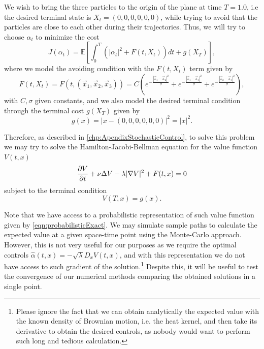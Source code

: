 We wish to bring the three particles to the origin of the plane at time $T=1.0$, i.e the desired terminal state is $X_t=(0,0,0,0,0,0)$, while trying to avoid that the particles are close to each other during their trajectories. Thus, we will try to choose $\alpha_t$ to minimize the cost
\begin{equation}
	J(\alpha_t)=\mathbb{E}\left[\int_{0}^{T}(|\alpha_t|^2+F(t,X_t)) dt +g(X_T)\right],
\end{equation}   
where we model the avoiding condition with the $F(t,X_t)$ term given by
\begin{equation}
	F(t,X_t)=F(t,(\vec{x}_1,\vec{x}_2,\vec{x}_3))=C\left(e^{-\frac{|\vec{x}_1-\vec{x}_2|^2}{\sigma}}+e^{-\frac{|\vec{x}_1-\vec{x}_3|^2}{\sigma}}+e^{-\frac{|\vec{x}_2-\vec{x}_3|^2}{\sigma}}\right),
\end{equation}
with $C,\sigma$ given constants, and we also model the desired terminal condition through the terminal cost $g(X_T)$ given by 
\begin{equation}
	g(x)=|x-(0,0,0,0,0,0)|^2=|x|^2.
\end{equation}

Therefore, as described in \autoref{chp:ApendixStochasticControl}, to solve this problem we may try to solve the Hamilton-Jacobi-Bellman equation for the value function $V(t,x)$
\begin{equation}
	\label{eqn:HJB_example}
	\frac{\partial V}{\partial t}+\nu \Delta V -\lambda |\nabla V|^2+F(t,x)=0
\end{equation}
subject to the terminal condition 
\begin{equation}
	V(T,x)=g(x).
\end{equation}

Note that we have access to a probabilistic representation of such value function given by \eqref{eqn:probabilisticExact}. We may simulate sample paths to calculate the expected value at a given space-time point using the Monte-Carlo approach. However, this is not very useful for our purposes as we require the optimal controls $\hat{\alpha}(t,x)=-\sqrt{\lambda}D_x V(t,x)$, and with this representation we do not have access to such gradient of the solution.\footnote{Please ignore the fact that we can obtain analytically the expected value with the known density of Brownian motion, i.e. the heat kernel, and then take its derivative to obtain the desired controls, as nobody would want to perform such long and tedious calculation.} Despite this, it will be useful to test the convergence of our numerical methods comparing the obtained solutions in a single point.

